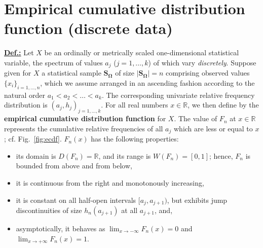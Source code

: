 \section[Empirical cumulative distribution function (discrete
data)]{Empirical cumulative distribution function (discrete data)}
\underline{\textbf{Def.:}} Let $X$ be an ordinally or metrically
scaled one-dimensional statistical variable, the spectrum of values 
$a_{j}$ ($j=1,\ldots,k$) of which vary \textit{discretely}. Suppose 
given for $X$ a statistical sample $\boldsymbol{S_{\Omega}}$ of 
size $|\boldsymbol{S_{\Omega}}|=n$ comprising observed values 
$\{x_{i}\}_{i=1,\ldots,n}$, which we assume arranged in an 
ascending fashion according to the natural order $a_{1} < a_{2} < 
\ldots < a_{k}$. The corresponding univariate relative frequency 
distribution is $(a_{j},h_{j})_{j=1,\ldots,k}$. For all real 
numbers $x \in \mathbb{R}$, we then define by
%
\be
{}
\ee
%
the \textbf{empirical cumulative distribution function} for $X$.
The value of $F_{n}$ at $x \in \mathbb{R}$ represents the
cumulative relative frequencies of all $a_{j}$ which are less
or equal to $x$; cf. Fig.~\ref{fig:ecdf}. $F_{n}(x)$ has the
following properties:
%
\begin{itemize}

\item its domain is $D(F_{n})=\mathbb{R}$, and its range is 
$W(F_{n})=[0,1]$; hence, $F_{n}$ is bounded from above and from 
below,

\item it is continuous from the right and monotonously increasing,

\item it is constant on all half-open intervals $[a_{j},a_{j+1})$, 
but exhibits jump discontinuities of size $h_{n}(a_{j+1})$ at all 
$a_{j+1}$, and,

\item asymptotically, it behaves as ${\displaystyle \lim_{x\to 
-\infty}F_{n}(x)=0}$ and ${\displaystyle \lim_{x\to 
+\infty}F_{n}(x)=1}$.

\end{itemize}
%


